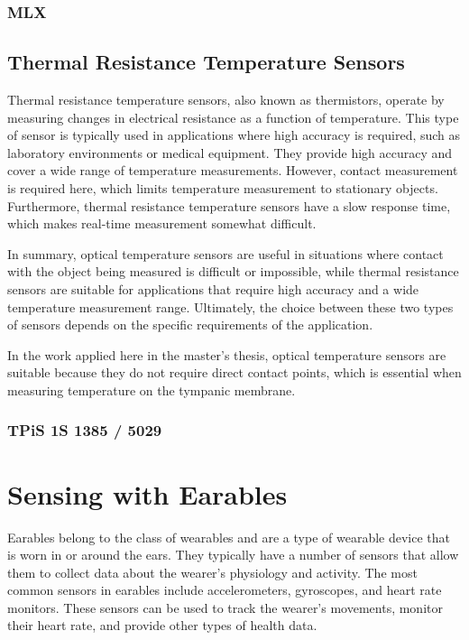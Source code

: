 \subsubsection{MLX}

\subsection{Thermal Resistance Temperature Sensors}
Thermal resistance temperature sensors, also known as thermistors, operate by measuring changes in electrical resistance as a function of temperature. 
This type of sensor is typically used in applications where high accuracy is required, such as laboratory environments or medical equipment.
They provide high accuracy and cover a wide range of temperature measurements.
However, contact measurement is required here, which limits temperature measurement to stationary objects.
Furthermore, thermal resistance temperature sensors have a slow response time, which makes real-time measurement somewhat difficult.

In summary, optical temperature sensors are useful in situations where contact with the object being measured is difficult or impossible, while thermal resistance sensors are suitable for applications that require high accuracy and a wide temperature measurement range. 
Ultimately, the choice between these two types of sensors depends on the specific requirements of the application.

In the work applied here in the master's thesis, optical temperature sensors are suitable because they do not require direct contact points, which is essential when measuring temperature on the tympanic membrane.

\subsubsection{TPiS 1S 1385 / 5029}

\section{Sensing with Earables}
Earables belong to the class of wearables and are a type of wearable device that is worn in or around the ears. 
They typically have a number of sensors that allow them to collect data about the wearer's physiology and activity. 
The most common sensors in earables include accelerometers, gyroscopes, and heart rate monitors. These sensors can be used to track the wearer's movements, monitor their heart rate, and provide other types of health data.

